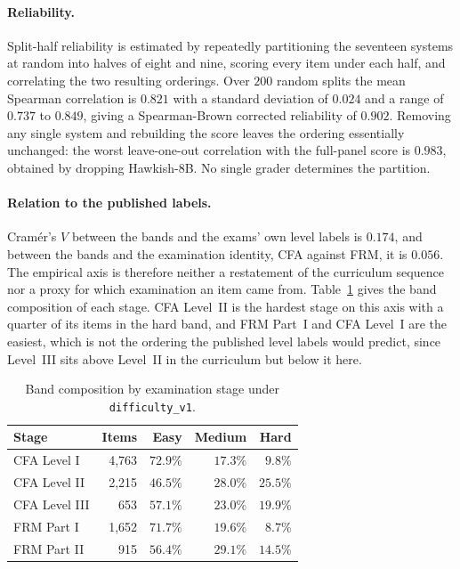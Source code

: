 \paragraph{Reliability.}
Split-half reliability is estimated by repeatedly partitioning the seventeen systems at random
into halves of eight and nine, scoring every item under each half, and correlating the two
resulting orderings. Over $200$ random splits the mean Spearman correlation is $0.821$ with a
standard deviation of $0.024$ and a range of $0.737$ to $0.849$, giving a Spearman-Brown
corrected reliability of $0.902$. Removing any single system and rebuilding the score leaves the
ordering essentially unchanged: the worst leave-one-out correlation with the full-panel score is
$0.983$, obtained by dropping Hawkish-8B. No single grader determines the partition.

\paragraph{Relation to the published labels.}
Cram\'er's $V$ between the bands and the exams' own level labels is $0.174$, and between the
bands and the examination identity, CFA against FRM, it is $0.056$. The empirical axis is
therefore neither a restatement of the curriculum sequence nor a proxy for which examination an
item came from. Table~\ref{tab:difficulty-by-stage} gives the band composition of each stage.
CFA Level~II is the hardest stage on this axis with a quarter of its items in the hard band, and
FRM Part~I and CFA Level~I are the easiest, which is not the ordering the published level labels
would predict, since Level~III sits above Level~II in the curriculum but below it here.

\begin{table}[t]
\centering\small
\begin{tabular}{lrrrr}
\toprule
\textbf{Stage} & \textbf{Items} & \textbf{Easy} & \textbf{Medium} & \textbf{Hard} \\
\midrule
CFA Level I   & 4{,}763 & $72.9\%$ & $17.3\%$ & $9.8\%$  \\
CFA Level II  & 2{,}215 & $46.5\%$ & $28.0\%$ & $25.5\%$ \\
CFA Level III & 653     & $57.1\%$ & $23.0\%$ & $19.9\%$ \\
FRM Part I    & 1{,}652 & $71.7\%$ & $19.6\%$ & $8.7\%$  \\
FRM Part II   & 915     & $56.4\%$ & $29.1\%$ & $14.5\%$ \\
\bottomrule
\end{tabular}
\caption{Band composition by examination stage under \texttt{difficulty\_v1}.}
\label{tab:difficulty-by-stage}
\end{table}

